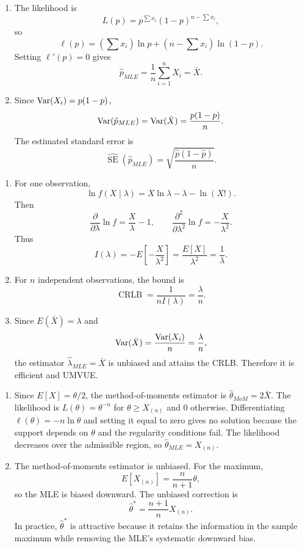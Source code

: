 \begin{solproblema}
\begin{enumerate}[label=(\alph*)]
	\item The likelihood is
	\[
		L(p)=p^{\sum x_i}(1-p)^{n-\sum x_i},
	\]
	so
	\[
		\ell(p)=\left(\sum x_i\right)\ln p+\left(n-\sum x_i\right)\ln(1-p).
	\]
	Setting $\ell'(p)=0$ gives
	\[
		\hat p_{MLE}=\frac1n\sum_{i=1}^n X_i=\bar X.
	\]
	\item Since $\operatorname{Var}(X_i)=p(1-p)$,
	\[
		\operatorname{Var}(\hat p_{MLE})=\operatorname{Var}(\bar X)=\frac{p(1-p)}{n}.
	\]
	The estimated standard error is
	\[
		\widehat{\operatorname{SE}}(\hat p_{MLE})=\sqrt{\frac{\hat p(1-\hat p)}{n}}.
	\]
\end{enumerate}
\end{solproblema}

\begin{solproblema}[prob:977b8dd]
\begin{enumerate}[label=(\alph*)]
	\item For one observation,
	\[
		\ln f(X\mid\lambda)=X\ln\lambda-\lambda-\ln(X!).
	\]
	Then
	\[
		\frac{\partial}{\partial\lambda}\ln f=\frac X\lambda-1,\qquad
		\frac{\partial^2}{\partial\lambda^2}\ln f=-\frac X{\lambda^2}.
	\]
	Thus
	\[
		I(\lambda)=-E\left[-\frac X{\lambda^2}\right]=\frac{E[X]}{\lambda^2}=\frac1\lambda.
	\]
	\item For $n$ independent observations, the bound is
	\[
		\operatorname{CRLB}=\frac{1}{nI(\lambda)}=\frac{\lambda}{n}.
	\]
	\item Since $E(\bar X)=\lambda$ and
	\[
		\operatorname{Var}(\bar X)=\frac{\operatorname{Var}(X_i)}n=\frac{\lambda}{n},
	\]
	the estimator $\hat\lambda_{MLE}=\bar X$ is unbiased and attains the CRLB. Therefore it is efficient and UMVUE.
\end{enumerate}
\end{solproblema}

\begin{solproblema}[prob:23bb182]
\begin{enumerate}[label=(\alph*)]
	\item Since $E[X]=\theta/2$, the method-of-moments estimator is $\hat\theta_{MoM}=2\bar X$. The likelihood is $L(\theta)=\theta^{-n}$ for $\theta\ge X_{(n)}$ and $0$ otherwise. Differentiating $\ell(\theta)=-n\ln\theta$ and setting it equal to zero gives no solution because the support depends on $\theta$ and the regularity conditions fail. The likelihood decreases over the admissible region, so $\hat\theta_{MLE}=X_{(n)}$.
	\item The method-of-moments estimator is unbiased. For the maximum,
	\[
		E[X_{(n)}]=\frac{n}{n+1}\theta,
	\]
	so the MLE is biased downward. The unbiased correction is
	\[
		\hat\theta^*=\frac{n+1}{n}X_{(n)}.
	\]
	In practice, $\hat\theta^*$ is attractive because it retains the information in the sample maximum while removing the MLE's systematic downward bias.
\end{enumerate}
\end{solproblema}

